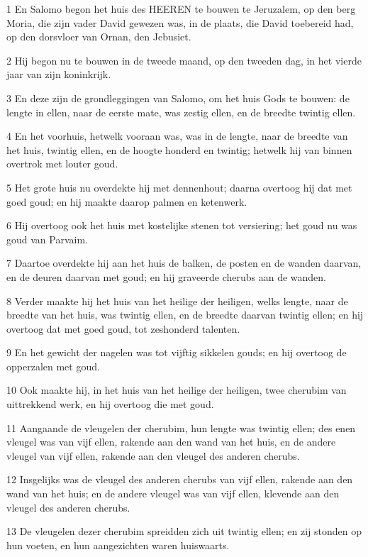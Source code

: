 \par 1 En Salomo begon het huis des HEEREN te bouwen te Jeruzalem, op den berg Moria, die zijn vader David gewezen was, in de plaats, die David toebereid had, op den dorsvloer van Ornan, den Jebusiet.
\par 2 Hij begon nu te bouwen in de tweede maand, op den tweeden dag, in het vierde jaar van zijn koninkrijk.
\par 3 En deze zijn de grondleggingen van Salomo, om het huis Gods te bouwen: de lengte in ellen, naar de eerste mate, was zestig ellen, en de breedte twintig ellen.
\par 4 En het voorhuis, hetwelk vooraan was, was in de lengte, naar de breedte van het huis, twintig ellen, en de hoogte honderd en twintig; hetwelk hij van binnen overtrok met louter goud.
\par 5 Het grote huis nu overdekte hij met dennenhout; daarna overtoog hij dat met goed goud; en hij maakte daarop palmen en ketenwerk.
\par 6 Hij overtoog ook het huis met kostelijke stenen tot versiering; het goud nu was goud van Parvaim.
\par 7 Daartoe overdekte hij aan het huis de balken, de posten en de wanden daarvan, en de deuren daarvan met goud; en hij graveerde cherubs aan de wanden.
\par 8 Verder maakte hij het huis van het heilige der heiligen, welks lengte, naar de breedte van het huis, was twintig ellen, en de breedte daarvan twintig ellen; en hij overtoog dat met goed goud, tot zeshonderd talenten.
\par 9 En het gewicht der nagelen was tot vijftig sikkelen gouds; en hij overtoog de opperzalen met goud.
\par 10 Ook maakte hij, in het huis van het heilige der heiligen, twee cherubim van uittrekkend werk, en hij overtoog die met goud.
\par 11 Aangaande de vleugelen der cherubim, hun lengte was twintig ellen; des enen vleugel was van vijf ellen, rakende aan den wand van het huis, en de andere vleugel van vijf ellen, rakende aan den vleugel des anderen cherubs.
\par 12 Insgelijks was de vleugel des anderen cherubs van vijf ellen, rakende aan den wand van het huis; en de andere vleugel was van vijf ellen, klevende aan den vleugel des anderen cherubs.
\par 13 De vleugelen dezer cherubim spreidden zich uit twintig ellen; en zij stonden op hun voeten, en hun aangezichten waren huiswaarts.
